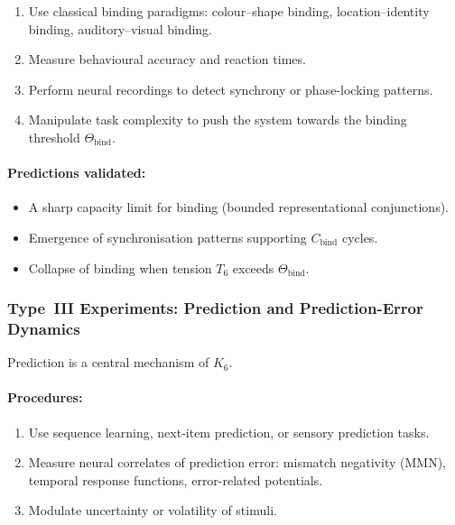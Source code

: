 \begin{enumerate}
    \item Use classical binding paradigms:
          colour–shape binding, location–identity binding,
          auditory–visual binding.
    \item Measure behavioural accuracy and reaction times.
    \item Perform neural recordings to detect synchrony or
          phase-locking patterns.
    \item Manipulate task complexity to push the system towards
          the binding threshold $\Theta_{\mathrm{bind}}$.
\end{enumerate}

\paragraph{Predictions validated:}

\begin{itemize}
    \item A sharp capacity limit for binding 
          (bounded representational conjunctions).
    \item Emergence of synchronisation patterns supporting 
          $C_{\mathrm{bind}}$ cycles.
    \item Collapse of binding when tension $T_6$ exceeds
          $\Theta_{\mathrm{bind}}$.
\end{itemize}



\subsubsection{Type~III Experiments: Prediction and Prediction-Error Dynamics}

Prediction is a central mechanism of $K_6$.

\paragraph{Procedures:}

\begin{enumerate}
    \item Use sequence learning, next-item prediction,
          or sensory prediction tasks.
    \item Measure neural correlates of prediction error:
          mismatch negativity (MMN), temporal response functions,
          error-related potentials.
    \item Modulate uncertainty or volatility of stimuli.
\end{enumerate}

